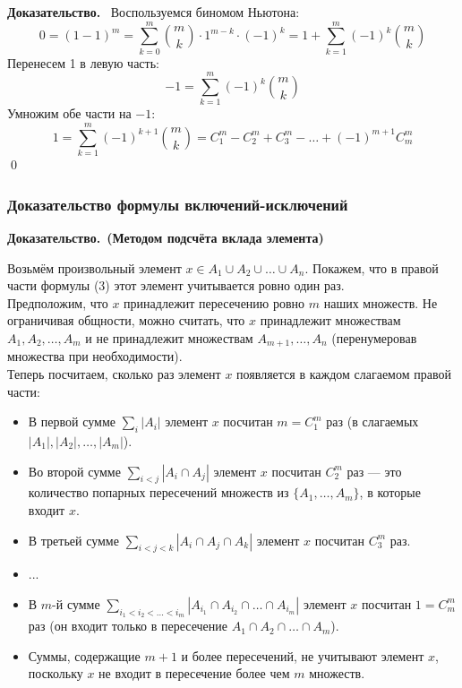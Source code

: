 \documentclass[a4paper,12pt]{article}
\newcommand{\myproof}{\textbf{Доказательство.}\ }
\begin{document}
	\myproof
	Воспользуемся биномом Ньютона:
	\[ 0 = (1 - 1)^m = \sum_{k=0}^m \binom{m}{k} \cdot 1^{m-k} \cdot (-1)^k = 1 + \sum_{k=1}^m (-1)^k \binom{m}{k} \]
	Перенесем 1 в левую часть:
	\[ -1 = \sum_{k=1}^m (-1)^k \binom{m}{k} \]
	Умножим обе части на $-1$:
	\[ 1 = \sum_{k=1}^m (-1)^{k+1} \binom{m}{k} = C_1^m - C_2^m + C_3^m - \dots + (-1)^{m+1} C_m^m \]
	\qed
	
	\subsubsection{Доказательство формулы включений-исключений}
	
	\myproof \textbf{(Методом подсчёта вклада элемента)}
	
	Возьмём произвольный элемент $x \in A_1 \cup A_2 \cup \dots \cup A_n$. Покажем, что в правой части формулы (3) этот элемент учитывается ровно один раз.\\
	
	Предположим, что $x$ принадлежит пересечению ровно $m$ наших множеств. Не ограничивая общности, можно считать, что $x$ принадлежит множествам $A_1, A_2, \dots, A_m$ и не принадлежит множествам $A_{m+1}, \dots, A_n$ (перенумеровав множества при необходимости).\\
	
	Теперь посчитаем, сколько раз элемент $x$ появляется в каждом слагаемом правой части:
	
	\begin{itemize}
		\item В первой сумме $\sum_i |A_i|$ элемент $x$ посчитан $m = C_1^m$ раз (в слагаемых $|A_1|, |A_2|, \dots, |A_m|$).
		\item Во второй сумме $\sum_{i<j} |A_i \cap A_j|$ элемент $x$ посчитан $C_2^m$ раз — это количество попарных пересечений множеств из $\{A_1, \dots, A_m\}$, в которые входит $x$.
		\item В третьей сумме $\sum_{i<j<k} |A_i \cap A_j \cap A_k|$ элемент $x$ посчитан $C_3^m$ раз.
		\item ...
		\item В $m$-й сумме $\sum_{i_1 < i_2 < \dots < i_m} |A_{i_1} \cap A_{i_2} \cap \dots \cap A_{i_m}|$ элемент $x$ посчитан $1 = C_m^m$ раз (он входит только в пересечение $A_1 \cap A_2 \cap \dots \cap A_m$).
		\item Суммы, содержащие $m+1$ и более пересечений, не учитывают элемент $x$, поскольку $x$ не входит в пересечение более чем $m$ множеств.
	\end{itemize}
	
\end{document}
